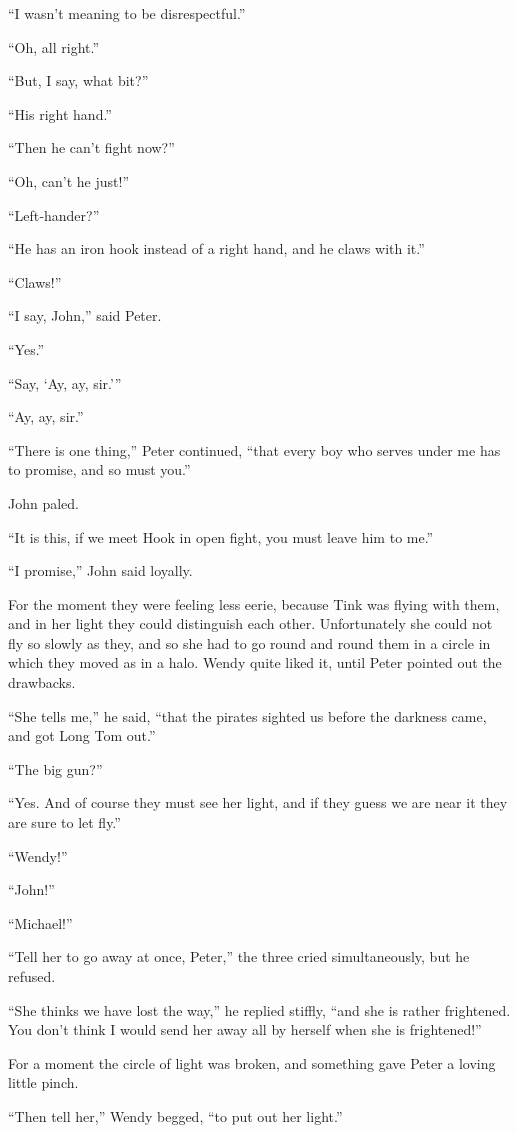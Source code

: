 “I wasn’t meaning to be disrespectful.”

“Oh, all right.”

“But, I say, what bit?”

“His right hand.”

“Then he can’t fight now?”

“Oh, can’t he just!”

“Left‐hander?”

“He has an iron hook instead of a right hand,
and he claws with it.”

“Claws!”

“I say, John,” said Peter.

“Yes.”

“Say, ‘Ay, ay, sir.’”

“Ay, ay, sir.”

“There is one thing,” Peter continued,
“that every boy who serves under me has to promise,
and so must you.”

John paled.

“It is this, if we meet Hook in open fight,
you must leave him to me.”

“I promise,” John said loyally.

For the moment they were feeling less eerie,
because Tink was flying with them, and in her light they could distinguish each other.
Unfortunately she could not fly so slowly as they,
and so she had to go round and round them in a circle in which they moved as in a halo.
Wendy quite liked it, until Peter pointed out the drawbacks.

“She tells me,” he said, “that the pirates sighted us before the darkness came,
and got Long Tom out.”

“The big gun?”

“Yes.
And of course they must see her light,
and if they guess we are near it they are sure to let fly.”

“Wendy!”

“John!”

“Michael!”

“Tell her to go away at once, Peter,” the three cried simultaneously, but he refused.

“She thinks we have lost the way,” he replied stiffly, “and she is rather frightened.
You don’t think I would send her away all by herself when she is frightened!”

For a moment the circle of light was broken, and something gave Peter a loving little pinch.

“Then tell her,” Wendy begged, “to put out her light.”

